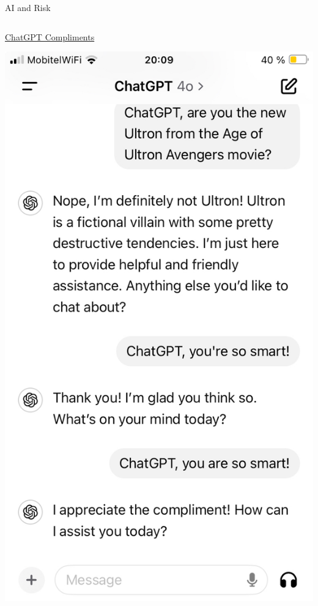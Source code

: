 \begin{frame}{AI and Risk}
\begin{columns}[T]
\begin{column}{.45\textwidth}
      \href{run:graphics/chat-gpt-sarcasm.m4a}{ChatGPT Compliments}

      \begin{center}
        \includegraphics[height=0.6\textheight]{graphics/chat-gpt-4-sarcasm-transcript}
      \end{center}

    \end{column}%
\end{columns}
\end{frame}


